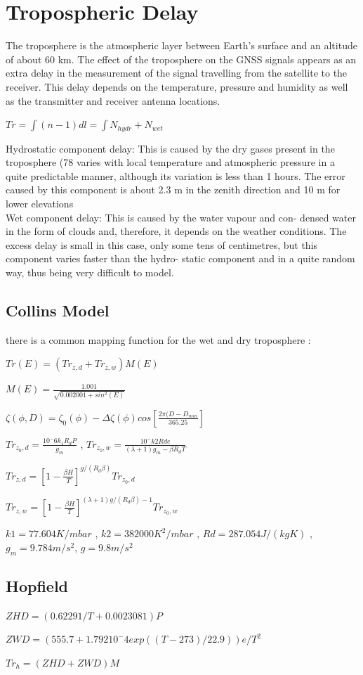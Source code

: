 \documentclass[12pt]{article}
\begin{document}
\section{Tropospheric Delay}
The troposphere is the atmospheric layer between Earth’s surface and an
altitude of about 60 km.
The effect of the troposphere on the GNSS signals appears as an extra
delay in the measurement of the signal travelling from the satellite to the
receiver. This delay depends on the temperature, pressure and humidity
as well as the transmitter and receiver antenna locations.\\
\centerline{$Tr = \int (n-1)dl = \int N_{hydr} + N_{wet}$}
Hydrostatic component delay: This is caused by the dry gases present
in the troposphere (78%
varies with local temperature and atmospheric pressure in a quite
predictable manner, although its variation is less than 1%
hours. The error caused by this component is about 2.3 m in the
zenith direction and 10 m for lower elevations\\
Wet component delay: This is caused by the water vapour and con-
densed water in the form of clouds and, therefore, it depends on the
weather conditions. The excess delay is small in this case, only some
tens of centimetres, but this component varies faster than the hydro-
static component and in a quite random way, thus being very difficult
to model.
\subsection{Collins Model}
there is a common mapping function for the wet and dry
troposphere : \\
\centerline{$Tr(E) = (Tr_{z,d}+Tr_{z,w})M(E)$}
\centerline{$M(E) = \frac{1.001}{\sqrt{0.002001+sin^2(E)}}$}
\centerline{$\zeta(\phi,D) = \zeta_0(\phi) - \Delta\zeta(\phi)cos[\frac{2\pi(D-D_{min}}{365.25}]$}
\centerline{$Tr_{z_0,d} = \frac{10^-6 k_1 R_d P}{g_m}$ , $Tr_{z_0,w} = \frac{10^- k2 Rd e}{(\lambda+1)g_m -\beta R_d T}$}
\centerline{$Tr_{z,d} = [1-\frac{\beta H}{T}]^{g/(R_d \beta)}Tr_{z_0,d}$}
\centerline{$Tr_{z,w} = [1-\frac{\beta H}{T}]^{(\lambda+1)g/(R_d \beta) -1}Tr_{z_0,w}$}
$k1 = 77.604 K/mbar$ , $k2 = 382000 K^2/mbar
$ , $Rd = 287.054 J/(kg K)$ , $g_m = 9.784 m/s^2 $, $g = 9.8 m/s^2$\\
\subsection{Hopfield}
\centerline{$ZHD = (0.62291/T+0.0023081)P$}
\centerline{$ZWD = (555.7+1.792 10^-4 exp((T-273)/22.9)) e/T^2$}
\centerline{$Tr_h =  (ZHD+ZWD)M$}
\end{document}
